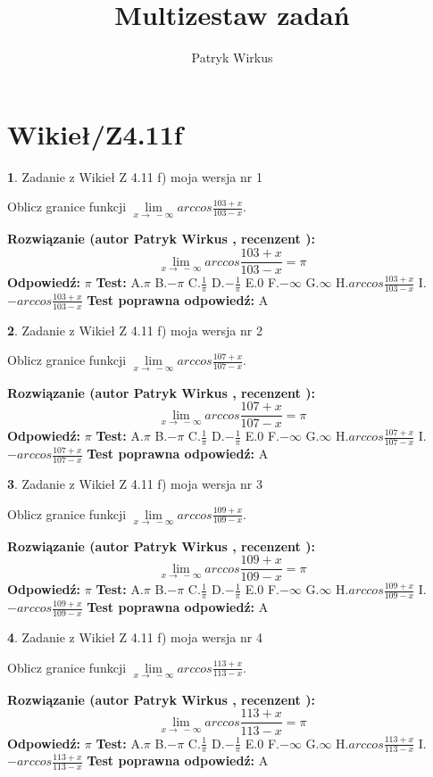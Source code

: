 \documentclass[12pt, a4paper]{article}
\title{Multizestaw zadań}
\author{Patryk Wirkus}
\date{}
\theoremstyle{definition} %
\newtheorem{zad}{}
\newcommand{\kategoria}[1]{\section{#1}}
\newcommand{\zadStart}[1]{\begin{zad}#1\newline}
\newcommand{\zadStop}{\end{zad}}
\newcommand{\rozwStart}[2]{\noindent \textbf{Rozwiązanie (autor #1 , recenzent #2): }\newline}
\newcommand{\rozwStop}{\newline}
\newcommand{\odpStart}{\noindent \textbf{Odpowiedź:}\newline}
\newcommand{\odpStop}{\newline}
\newcommand{\testStart}{\noindent \textbf{Test:}\newline}
\newcommand{\testStop}{\newline}
\newcommand{\kluczStart}{\noindent \textbf{Test poprawna odpowiedź:}\newline}
\newcommand{\kluczStop}{\newline}
\begin{document}
\maketitle

\kategoria{Wikieł/Z4.11f}


\zadStart{Zadanie z Wikieł Z 4.11 f) moja wersja nr 1}

Oblicz granice funkcji $\lim\limits_{x\to\ -\infty}arccos\frac{103+x}{103-x}$.
\zadStop
\rozwStart{Patryk Wirkus}{}
$$\lim\limits_{x\to\ -\infty}arccos\frac{103+x}{103-x} = \pi$$
\rozwStop
\odpStart
$\pi$
\odpStop
\testStart
A.$\pi$ B.$-\pi$ C.$\frac{1}{\pi}$ D.$-\frac{1}{\pi}$ E.$0$ F.$-\infty$ G.$\infty$ H.$arccos\frac{103+x}{103-x}$ I.$-arccos\frac{103+x}{103-x}$
\testStop
\kluczStart
A
\kluczStop



\zadStart{Zadanie z Wikieł Z 4.11 f) moja wersja nr 2}

Oblicz granice funkcji $\lim\limits_{x\to\ -\infty}arccos\frac{107+x}{107-x}$.
\zadStop
\rozwStart{Patryk Wirkus}{}
$$\lim\limits_{x\to\ -\infty}arccos\frac{107+x}{107-x} = \pi$$
\rozwStop
\odpStart
$\pi$
\odpStop
\testStart
A.$\pi$ B.$-\pi$ C.$\frac{1}{\pi}$ D.$-\frac{1}{\pi}$ E.$0$ F.$-\infty$ G.$\infty$ H.$arccos\frac{107+x}{107-x}$ I.$-arccos\frac{107+x}{107-x}$
\testStop
\kluczStart
A
\kluczStop



\zadStart{Zadanie z Wikieł Z 4.11 f) moja wersja nr 3}

Oblicz granice funkcji $\lim\limits_{x\to\ -\infty}arccos\frac{109+x}{109-x}$.
\zadStop
\rozwStart{Patryk Wirkus}{}
$$\lim\limits_{x\to\ -\infty}arccos\frac{109+x}{109-x} = \pi$$
\rozwStop
\odpStart
$\pi$
\odpStop
\testStart
A.$\pi$ B.$-\pi$ C.$\frac{1}{\pi}$ D.$-\frac{1}{\pi}$ E.$0$ F.$-\infty$ G.$\infty$ H.$arccos\frac{109+x}{109-x}$ I.$-arccos\frac{109+x}{109-x}$
\testStop
\kluczStart
A
\kluczStop



\zadStart{Zadanie z Wikieł Z 4.11 f) moja wersja nr 4}

Oblicz granice funkcji $\lim\limits_{x\to\ -\infty}arccos\frac{113+x}{113-x}$.
\zadStop
\rozwStart{Patryk Wirkus}{}
$$\lim\limits_{x\to\ -\infty}arccos\frac{113+x}{113-x} = \pi$$
\rozwStop
\odpStart
$\pi$
\odpStop
\testStart
A.$\pi$ B.$-\pi$ C.$\frac{1}{\pi}$ D.$-\frac{1}{\pi}$ E.$0$ F.$-\infty$ G.$\infty$ H.$arccos\frac{113+x}{113-x}$ I.$-arccos\frac{113+x}{113-x}$
\testStop
\kluczStart
A
\kluczStop
\end{document}
